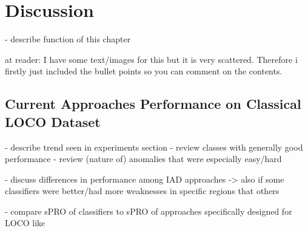 \chapter{Discussion}
\label{chap:results}

- describe function of this chapter

at reader: I have some text/images for this but it is very scattered. Therefore i firstly just included the bullet points so you can comment on the contents.


\section{Current Approaches Performance on Classical LOCO Dataset}
\label{sec:locoresultssota}

- describe trend seen in experiments section
- review classes with generally good performance
- review (nature of) anomalies that were especially easy/hard

- discuss differences in performance among IAD approaches
-> also if some classifiers were better/had more weaknesses in specific regions that others

- compare sPRO of classifiers to sPRO of approaches specifically designed for LOCO like \cite{LOCODentsAndScratchesBergmann2022}

